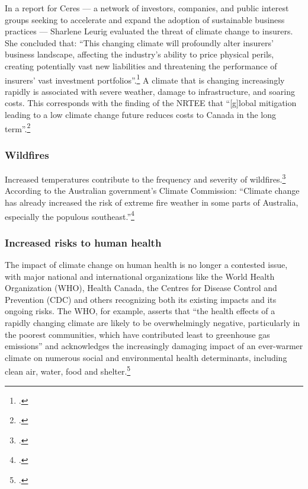 In a report for Ceres --- a  network of investors, companies, and public interest groups seeking to accelerate and expand the adoption of sustainable business practices --- Sharlene Leurig evaluated the threat of climate change to insurers.
She concluded that: ``This changing climate will profoundly alter insurers' business landscape, affecting the industry's ability to price physical perils, creating potentially vast new liabilities and threatening the performance of insurers' vast investment portfolios''.\footcite[][p. 9]{ClimateRiskInsurers}
A climate that is changing increasingly rapidly is associated with severe weather, damage to infrastructure, and soaring costs.
This corresponds with the finding of the NRTEE that ``[g]lobal mitigation leading to a low climate change future reduces costs to Canada in the long term''.\footcite[][p. 16]{NRTEEPrice}



	\subsubsection{Wildfires}
	


Increased temperatures contribute to the frequency and severity of wildfires.\footcite[][p. 33, 48, 50, 51, 53, 65 ]{IPCCar4_syr}
According to the Australian government's Climate Commission: ``Climate change has already increased the risk of extreme fire weather in some parts of Australia, especially the populous southeast.''\footcite[][p. 4]{CriticalDecade2013}



	\subsubsection{Increased risks to human health}



The impact of climate change on human health is no longer a contested issue, with major national and international organizations like the World Health Organization (WHO), Health Canada, the Centres for Disease Control and Prevention (CDC) and others recognizing both its existing impacts and its ongoing risks. 
The WHO, for example, asserts that ``the health effects of a rapidly changing climate are likely to be overwhelmingly negative, particularly in the poorest communities, which have contributed least to greenhouse gas emissions'' and acknowledges the increasingly damaging impact of an ever-warmer climate on numerous social and environmental health determinants, including clean air, water, food and shelter.\footcite[][]{WHOClimateHealth}



